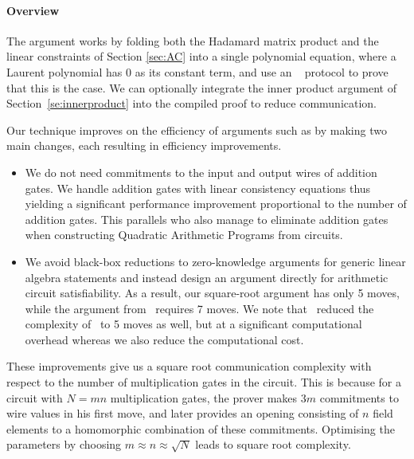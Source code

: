\paragraph{Overview} The argument works by folding both the Hadamard matrix product and the linear constraints of Section \ref{sec:AC} into a single polynomial equation, where a Laurent polynomial has 0 as its constant term, and use an \ILC~ protocol to prove that this is the case. We can optionally integrate the inner product argument of Section~\ref{se:innerproduct} into the compiled proof to reduce communication. 


Our technique improves on the efficiency of arguments such as \cite{Groth2009b} by making two main changes, each resulting in efficiency improvements.
\begin{itemize}
\item We do not need commitments to the input and output wires of addition gates. We handle addition gates with linear consistency equations thus yielding a significant performance improvement proportional to the number of addition gates. This parallels \cite{Gennaro2013} who also manage to eliminate addition gates when constructing Quadratic Arithmetic Programs from circuits.
\item We avoid black-box reductions to zero-knowledge arguments for generic linear algebra statements and instead design an argument directly for arithmetic circuit satisfiability. As a result, our square-root argument has only 5 moves, while the argument from~\cite{Groth2009b} requires 7 moves. We note that~\cite{Seo2011a} reduced the complexity of~\cite{Groth2009b} to 5 moves as well, but at a significant computational overhead whereas we also reduce the computational cost.
\end{itemize}

These improvements give us a square root communication complexity with respect to the number of multiplication gates in the circuit. This is because for a circuit with $N=mn$ multiplication gates, the prover makes $3m$ commitments to wire values in his first move, and later provides an opening consisting of $n$ field elements to a homomorphic combination of these commitments. Optimising the parameters by choosing $m\approx n \approx \sqrt{N}$
leads to square root complexity.

